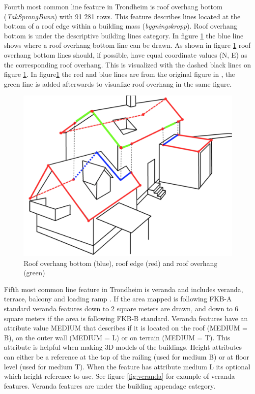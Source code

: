 Fourth most common line feature in Trondheim is roof overhang bottom (\textit{TakSprangBunn}) with 91 281 rows. This feature describes lines located at the bottom of a roof edge within a building mass (\textit{bygningskropp}). Roof overhang bottom is under the descriptive building lines category. In figure \ref{fig:taksprangbunn} the blue line shows where a roof overhang bottom line can be drawn. As shown in figure \ref{fig:taksprangbunn} roof overhang bottom lines should, if possible, have equal coordinate values (N, E) as the corresponding roof overhang. This is visualized with the dashed black lines on figure \ref{fig:taksprangbunn}. In figure\ref{fig:taksprangbunn} the red and blue lines are from the original figure in \cite{Kartverket2013a}, the green line is added afterwards to visualize roof overhang in the same figure.  

\begin{figure}[H]
    \centering
    \includegraphics[scale=0.4]{figures/FixedByMe/kurve_3fkb_tak.png}
    \caption{Roof overhang bottom (blue), roof edge (red) and roof overhang (green)}
    \label{fig:taksprangbunn}
\end{figure} 

Fifth most common line feature in Trondheim is veranda and includes veranda, terrace, balcony and loading ramp \cite{Kartverketb}. If the area mapped is following FKB-A standard veranda features down to 2 square meters are drawn, and down to 6 square meters if the area is following FKB-B standard. Veranda features have an attribute value MEDIUM that describes if it is located on the roof (MEDIUM = B), on the outer wall (MEDIUM = L) or on terrain (MEDIUM = T). This attribute is helpful when making 3D models of the buildings. Height attributes can either be a reference at the top of the railing (used for medium B) or at floor level (used for medium T). When the feature has attribute medium L its optional which height reference to use. See figure \ref{fig:veranda} for example of veranda features. Veranda features are under the building appendage category. 

